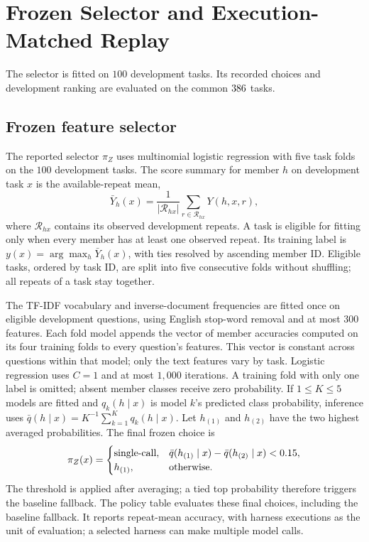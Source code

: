 \section{Frozen Selector and Execution-Matched Replay}\label{app:selection}
The selector is fitted on $100$ development tasks. Its recorded choices
and development ranking are evaluated on the common $386$ tasks.

\subsection{Frozen feature selector}
The reported selector $\pi_Z$ uses multinomial logistic regression with
five task folds on the $100$ development tasks. The score summary for
member $h$ on development task $x$ is the available-repeat mean,
\[
 \bar Y_h(x)=\frac{1}{|\mathcal R_{hx}|}
             \sum_{r\in\mathcal R_{hx}}Y(h,x,r),
\]
where $\mathcal R_{hx}$ contains its observed development repeats.
A task is eligible for fitting only when every member has at least one
observed repeat. Its training label is
$y(x)=\arg\max_h\bar Y_h(x)$, with ties resolved by ascending member ID.
Eligible tasks, ordered by task ID, are split into five consecutive
folds without shuffling; all repeats of a task stay together.

The TF-IDF vocabulary and inverse-document frequencies are fitted once
on eligible development questions, using English stop-word removal and
at most $300$ features. Each fold model appends the vector of member
accuracies computed on its four training folds to every question's
features. This vector is constant across questions within that model;
only the text features vary by task. Logistic regression uses
$C=1$ and at most $1{,}000$ iterations. A training fold with only one
label is omitted; absent member classes receive zero probability.
If $1\le K\le5$ models are fitted and $q_k(h\mid x)$ is model $k$'s
predicted class probability, inference uses
$\bar q(h\mid x)=K^{-1}\sum_{k=1}^Kq_k(h\mid x)$.
Let $h_{(1)}$ and $h_{(2)}$ have the two highest averaged probabilities.
The final frozen choice is
\[
 \pi_Z(x)=
 \begin{cases}
  \text{single-call{}}, & \bar q(h_{(1)}\mid x)-\bar q(h_{(2)}\mid x)<0.15,\\
  h_{(1)}, & \text{otherwise}.
 \end{cases}
\]
The threshold is applied after averaging; a tied top probability
therefore triggers the baseline fallback. The policy
table evaluates these final choices, including the baseline fallback.
It reports repeat-mean accuracy, with harness executions as the unit of
evaluation; a selected harness can make multiple model calls.


